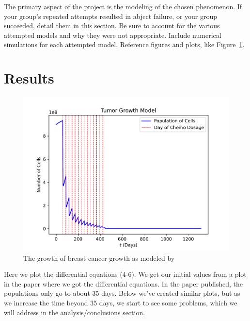 \documentclass[11pt]{amsart}
\begin{document}
 The primary aspect of the project is the modeling of the chosen phenomenon. If your group's repeated attempts resulted in abject failure, or your group succeeded, detail them in this section. Be sure to account for the various attempted models and why they were not appropriate. Include numerical simulations for each attempted model.  Reference figures and plots, like Figure~\ref{fig:MeanSquaredError}.


\section{Results}

\begin{figure}[htb]
\begin{center} %
\includegraphics[width=\textwidth]{./images/image.pdf} %
\end{center}
\caption{The growth of breast cancer growth as modeled by
}
\label{fig:MeanSquaredError} %
\end{figure}

Here we plot the differential equations (4-6). 
We get our initial values from a plot in the paper where we got the differential equations. 
In the paper published, the populations only go to about 35 days. 
Below we've created similar plots, but as we increase the time beyond 35 days, 
we start to see some problems, which we will address in the analysis/conclusions section.
\end{document}
